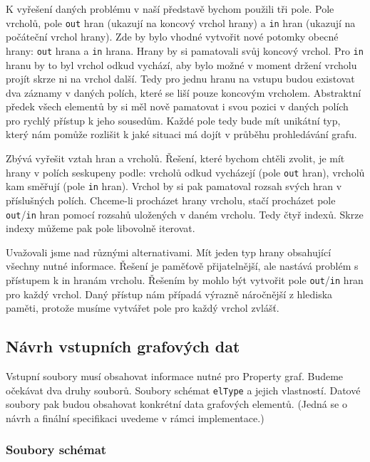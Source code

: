 K vyřešení daných problému v naší představě bychom použili tři pole.
Pole vrcholů, pole \texttt{out} hran (ukazují na koncový vrchol hrany) a \texttt{in} hran (ukazují na počáteční vrchol hrany). 
Zde by bylo vhodné vytvořit nové potomky obecné hrany: \texttt{out} hrana a \texttt{in} hrana.
Hrany by si pamatovali svůj koncový vrchol.
Pro \texttt{in} hranu by to byl vrchol odkud vychází, aby bylo možné v moment držení vrcholu projít skrze ni na vrchol další.
Tedy pro jednu hranu na vstupu budou existovat dva záznamy v daných polích, které se liší pouze koncovým vrcholem.
Abstraktní předek všech elementů by si měl nově pamatovat i svou pozici v daných polích pro rychlý přístup k jeho sousedům.
Každé pole tedy bude mít unikátní typ, který nám pomůže rozlišit k jaké situaci má dojít v průběhu prohledávání grafu.

Zbývá vyřešit vztah hran a vrcholů.
Řešení, které bychom chtěli zvolit, je mít hrany v polích seskupeny podle: vrcholů odkud vycházejí (pole \texttt{out} hran), vrcholů kam směřují (pole \texttt{in} hran).
Vrchol by si pak pamatoval rozsah svých hran v příslušných polích. 
Chceme-li procházet hrany vrcholu, stačí procházet pole \texttt{out}/\texttt{in} hran pomocí rozsahů uložených v daném vrcholu.
Tedy čtyř indexů.
Skrze indexy můžeme pak pole libovolně iterovat.

Uvažovali jsme nad různými alternativami. 
Mít jeden typ hrany obsahující všechny nutné informace.
Řešení je paměťově přijatelnější, ale nastává problém s přístupem k in hranám vrcholu.
Řešením by mohlo být vytvořit pole \texttt{out}/\texttt{in} hran pro každý vrchol. 
Daný přístup nám případá výrazně náročnější z hlediska paměti, protože musíme vytvářet pole pro každý vrchol zvlášť. 

\subsection{Návrh vstupních grafových dat} \label{anal.vstup}

Vstupní soubory musí obsahovat informace nutné pro Property graf.
Budeme očekávat dva druhy souborů.
Soubory schémat \texttt{elType} a jejich vlastností.
Datové soubory pak budou obsahovat konkrétní data grafových elementů.
(Jedná se o návrh a finální specifikaci uvedeme v rámci implementace.)

\subsubsection{Soubory schémat} 

